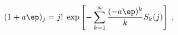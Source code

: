 \begin{equation}
(1+a\ep)_j = j! \; \exp\left[ -\sum_{k=1}^{\infty} \frac{(-a\ep)^k}{k}
S_k(j) \right] \; ,
\label{pochhamer}
\end{equation}

